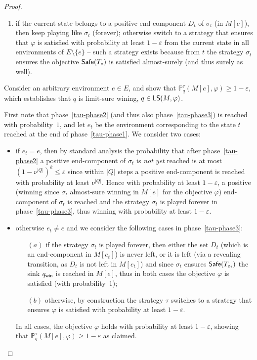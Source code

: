 \documentclass[a4paper,USenglish,cleveref, autoref, thm-restate]{lipics-v2021}
\let\epsilon\varepsilon
\def\abs#1{\ensuremath{\lvert #1 \rvert}}
\newcommand*{\pr}{\mathbb{P}}
\newcommand\limitsure{\textrm{\sf LS}}
\newcommand\Safe{\textrm{\sf Safe}}
\def\winabsorb{q_{\sf win}}
\begin{document}
\begin{proof}
\begin{enumerate}[label=(\theenumi)]
\item if the current state belongs to a positive end-component $D_t$ of $\sigma_t$ (in $M[e]$),
then keep playing like $\sigma_t$ (forever); otherwise switch to a strategy 
that ensures that $\varphi$ is satisfied with probability at least $1-\epsilon$
from the current state in all environments of $E \setminus \{e\}$ -- such a strategy 
exists because from $t$ the strategy $\sigma_t$ ensures the objective $\Safe(T_e)$
is satisfied almost-surely (and thus surely as well). \label{tau-phase3}
\end{enumerate}

Consider an arbitrary environment $e \in E$,
and show that $\pr_{q}^{\tau}(M[e], \varphi) \geq 1-\epsilon$,
which establishes that $q$ is limit-sure wining, $q \in \limitsure(M, \varphi)$.

First note that phase~\ref{tau-phase2} (and thus also phase~\ref{tau-phase3}) 
is reached with probability~$1$, and let $e_t$ be the environment corresponding to the state $t$ 
reached at the end of phase~\ref{tau-phase1}. We consider two cases:

\begin{itemize}
\item if $e_t = e$, then by standard analysis the probability that 
after phase~\ref{tau-phase2} a positive end-component of $\sigma_t$ is \emph{not yet} reached
is at most $(1-\nu^{\abs{Q}})^k \leq \epsilon$ since within $\abs{Q}$
steps a positive end-component is reached with probability at least 
$\nu^{\abs{Q}}$. Hence with probability at least $1-\epsilon$,
a positive (winning since $\sigma_t$ almost-sure winning in $M[e]$ for 
the objective $\varphi$) end-component of $\sigma_t$ is reached and
the strategy $\sigma_t$ is played forever in phase~\ref{tau-phase3},
thus winning with probability at least $1-\epsilon$.

\item otherwise $e_t \neq e$ and we consider the following cases in 
phase~\ref{tau-phase3}: 
\begin{itemize}
\item[$(a)$] if the strategy $\sigma_t$ is played forever, then either
the set $D_t$ (which is an end-component in $M[e_t]$) is never left, 
or it is left (via a revealing transition, as $D_t$
is not left in $M[e_t]$) and since $\sigma_t$ ensures $\Safe(T_{e_t})$
the sink $\winabsorb$ is reached in $M[e]$, thus in both cases
the objective $\varphi$ is satisfied (with probability~$1$); 
\item[$(b)$] otherwise, by construction the strategy $\tau$ switches to a strategy 
that ensures $\varphi$ is satisfied with probability at least $1-\epsilon$.
\end{itemize}

In all cases, the objective $\varphi$ holds with probability at least $1-\epsilon$,
showing that $\pr_{q}^{\tau}(M[e], \varphi) \geq 1-\epsilon$ as claimed.
\end{itemize}
\end{proof}
\end{document}
